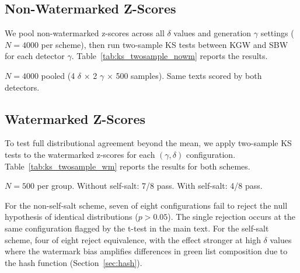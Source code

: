 \documentclass[11pt]{article}
\begin{document}
\subsection{Non-Watermarked Z-Scores}

We pool non-watermarked z-scores across all $\delta$ values and generation $\gamma$ settings ($N=4000$ per scheme), then run two-sample KS tests between KGW and SBW for each detector $\gamma$. Table~\ref{tab:ks_twosample_nowm} reports the results.

\begin{table}[!t]
\caption{Two-Sample KS Tests on Non-Watermarked Z-Scores}
\label{tab:ks_twosample_nowm}
\begin{center}
\footnotesize

\end{center}
\vspace{-2mm}
{\small $N=4000$ pooled (4 $\delta$ $\times$ 2 $\gamma$ $\times$ 500 samples). Same texts scored by both detectors.}
\end{table}

\subsection{Watermarked Z-Scores}

To test full distributional agreement beyond the mean, we apply two-sample KS tests to the watermarked z-scores for each $(\gamma, \delta)$ configuration. Table~\ref{tab:ks_twosample_wm} reports the results for both schemes.

\begin{table}[!t]
\caption{Two-Sample KS Tests on Watermarked Z-Scores}
\label{tab:ks_twosample_wm}
\begin{center}
\footnotesize

\end{center}
\vspace{-2mm}
{\small $N=500$ per group. Without self-salt: 7/8 pass. With self-salt: 4/8 pass.}
\end{table}

For the non-self-salt scheme, seven of eight configurations fail to reject the null hypothesis of identical distributions ($p > 0.05$). The single rejection occurs at the same configuration flagged by the t-test in the main text. For the self-salt scheme, four of eight reject equivalence, with the effect stronger at high $\delta$ values where the watermark bias amplifies differences in green list composition due to the hash function (Section~\ref{sec:hash}).
\end{document}
